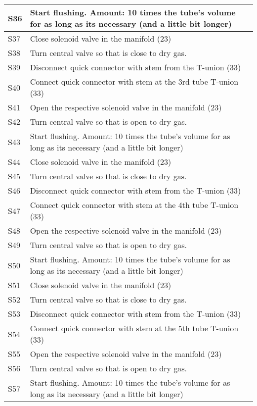 \begin{longtable} {|m{}|m{}|m{}|}
S36 & Start flushing. Amount: 10 times the tube's volume for as long as its necessary (and a little bit longer) & \\ \hline
S37 & Close solenoid valve in the manifold (23) & \\ \hline
S38 & Turn central valve so that is close to dry gas. & \\ \hline
S39 & Disconnect quick connector with stem from the T-union (33) & \\ \hline
S40 & Connect quick connector with stem at the 3rd tube T-union (33) & \\ \hline
S41 & Open the respective solenoid valve in the manifold (23) & \\ \hline
S42 & Turn central valve so that is open to dry gas. & \\ \hline
S43 & Start flushing. Amount: 10 times the tube's volume for as long as its necessary (and a little bit longer) & \\ \hline
S44 & Close solenoid valve in the manifold (23) & \\ \hline
S45 & Turn central valve so that is close to dry gas. & \\ \hline
S46 & Disconnect quick connector with stem from the T-union (33) & \\ \hline
S47 & Connect quick connector with stem at the 4th tube T-union (33) & \\ \hline
S48 & Open the respective solenoid valve in the manifold (23) & \\ \hline
S49 & Turn central valve so that is open to dry gas. & \\ \hline
S50 & Start flushing. Amount: 10 times the tube's volume for as long as its necessary (and a little bit longer) & \\ \hline
S51 & Close solenoid valve in the manifold (23) & \\ \hline
S52 & Turn central valve so that is close to dry gas. & \\ \hline
S53 & Disconnect quick connector with stem from the T-union (33) & \\ \hline
S54 & Connect quick connector with stem at the 5th tube T-union (33) & \\ \hline
S55 & Open the respective solenoid valve in the manifold (23) & \\ \hline
S56 & Turn central valve so that is open to dry gas. & \\ \hline
S57 & Start flushing. Amount: 10 times the tube's volume for as long as its necessary (and a little bit longer) & \\ \hline

\end{longtable}
